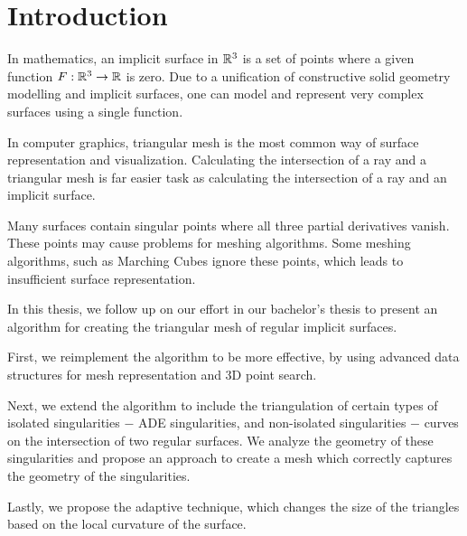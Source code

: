 \chapter*{Introduction} %

In mathematics, an implicit surface in $\mathbb{R}^3$ is a set of points where
a given function $F:\mathbb{R}^3 \to \mathbb{R}$ is zero. Due to a
unification of constructive solid geometry modelling and 
implicit surfaces, one can model and represent very 
complex surfaces using a single function.

In computer graphics, triangular mesh is the most common
way of surface representation and visualization. Calculating
the intersection of a ray and a triangular mesh is far 
easier task as calculating the intersection of a ray and
an implicit surface.

Many surfaces contain singular points where all three partial
derivatives vanish. These points may cause problems for
meshing algorithms. Some meshing algorithms, such as 
Marching Cubes ignore these points,
which leads to insufficient surface representation.

In this thesis, we follow up on our effort in our bachelor's thesis
\cite{korecova2021triangulation} to present an algorithm for
creating the triangular mesh of regular implicit surfaces.

First, we reimplement the algorithm to be more effective,
by using advanced data structures for mesh representation 
and 3D point search.

Next, we extend the algorithm to include the triangulation
of certain types of isolated singularities $-$ ADE singularities,
and non-isolated singularities $-$ curves on the intersection
of two regular surfaces.
We analyze the geometry of these singularities and propose 
an approach to create a mesh which correctly captures
the geometry of the singularities.

Lastly, we propose the adaptive technique, which changes the
size of the triangles based on the local curvature of the surface.
